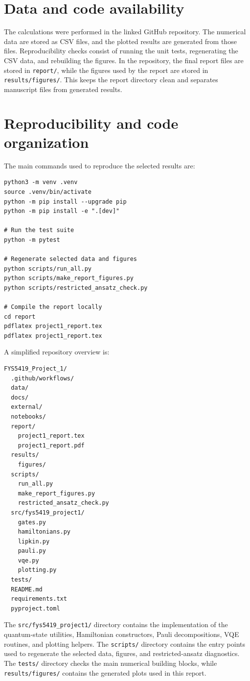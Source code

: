 \documentclass[10pt,a4paper]{article}
\begin{document}
\section*{Data and code availability}

The calculations were performed in the linked GitHub repository. The numerical data are stored as CSV files, and the plotted results are generated from those files. Reproducibility checks consist of running the unit tests, regenerating the CSV data, and rebuilding the figures. In the repository, the final report files are stored in \texttt{report/}, while the figures used by the report are stored in \texttt{results/figures/}. This keeps the report directory clean and separates manuscript files from generated results.

\appendix
\section{Reproducibility and code organization}\label{app:reproducibility}

The main commands used to reproduce the selected results are:

\begin{lstlisting}
python3 -m venv .venv
source .venv/bin/activate
python -m pip install --upgrade pip
python -m pip install -e ".[dev]"

# Run the test suite
python -m pytest

# Regenerate selected data and figures
python scripts/run_all.py
python scripts/make_report_figures.py
python scripts/restricted_ansatz_check.py

# Compile the report locally
cd report
pdflatex project1_report.tex
pdflatex project1_report.tex
\end{lstlisting}

A simplified repository overview is:

\begin{lstlisting}
FYS5419_Project_1/
  .github/workflows/
  data/
  docs/
  external/
  notebooks/
  report/
    project1_report.tex
    project1_report.pdf
  results/
    figures/
  scripts/
    run_all.py
    make_report_figures.py
    restricted_ansatz_check.py
  src/fys5419_project1/
    gates.py
    hamiltonians.py
    lipkin.py
    pauli.py
    vqe.py
    plotting.py
  tests/
  README.md
  requirements.txt
  pyproject.toml
\end{lstlisting}

The \texttt{src/fys5419\_project1/} directory contains the implementation of the quantum-state utilities, Hamiltonian constructors, Pauli decompositions, VQE routines, and plotting helpers. The \texttt{scripts/} directory contains the entry points used to regenerate the selected data, figures, and restricted-ansatz diagnostics. The \texttt{tests/} directory checks the main numerical building blocks, while \texttt{results/figures/} contains the generated plots used in this report.
\end{document}
